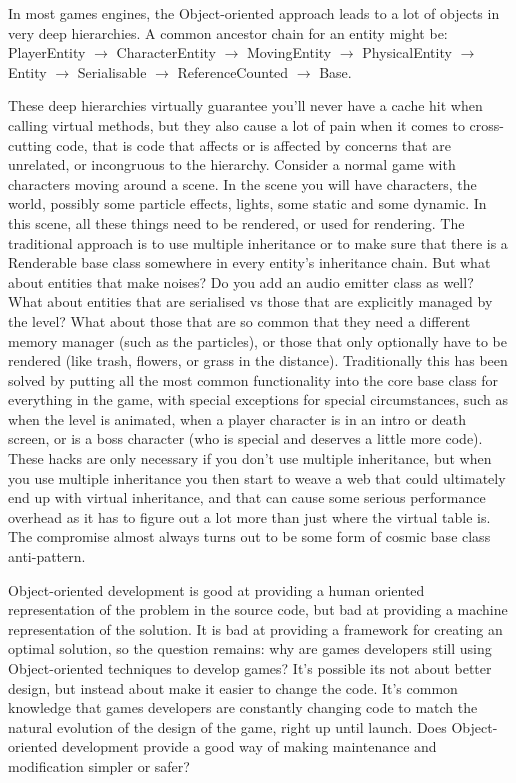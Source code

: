In most games engines, the Object-oriented approach leads to a lot of objects
in very deep hierarchies. A common ancestor chain for an entity might be:
PlayerEntity $\rightarrow$ CharacterEntity $\rightarrow$ MovingEntity $\rightarrow$ PhysicalEntity $\rightarrow$ Entity $\rightarrow$
Serialisable $\rightarrow$ ReferenceCounted $\rightarrow$ Base.

These deep hierarchies virtually guarantee you'll never have a cache hit when
calling virtual methods, but they also cause a lot of pain when it comes to
cross-cutting code, that is code that affects or is affected by concerns that
are unrelated, or incongruous to the hierarchy. Consider a normal game with
characters moving around a scene. In the scene you will have characters, the
world, possibly some particle effects, lights, some static and some dynamic. In
this scene, all these things need to be rendered, or used for rendering. The
traditional approach is to use multiple inheritance or to make sure that there
is a Renderable base class somewhere in every entity's inheritance chain. But
what about entities that make noises? Do you add an audio emitter class as
well? What about entities that are serialised vs those that are explicitly
managed by the level? What about those that are so common that they need a
different memory manager (such as the particles), or those that only optionally
have to be rendered (like trash, flowers, or grass in the distance).
Traditionally this has been solved by putting all the most common functionality
into the core base class for everything in the game, with special exceptions
for special circumstances, such as when the level is animated, when a player
character is in an intro or death screen, or is a boss character (who is
special and deserves a little more code).  These hacks are only necessary if
you don't use multiple inheritance, but when you use multiple inheritance you
then start to weave a web that could ultimately end up with virtual
inheritance, and that can cause some serious performance overhead as it has to
figure out a lot more than just where the virtual table is. The compromise
almost always turns out to be some form of cosmic base class anti-pattern.

Object-oriented development is good at providing a human oriented
representation of the problem in the source code, but bad at providing a
machine representation of the solution. It is bad at providing a framework for
creating an optimal solution, so the question remains: why are games developers
still using Object-oriented techniques to develop games? It's possible its not
about better design, but instead about make it easier to change the code. It's
common knowledge that games developers are constantly changing code to match
the natural evolution of the design of the game, right up until launch. Does
Object-oriented development provide a good way of making maintenance and
modification simpler or safer?

